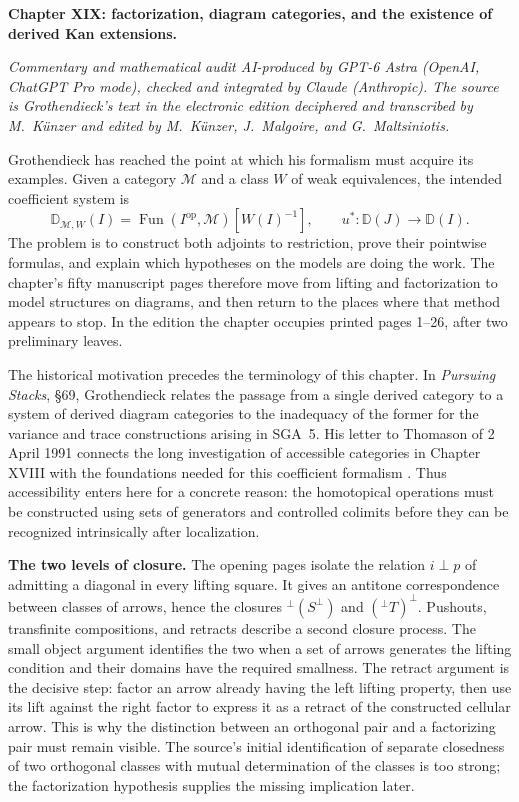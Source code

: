 \begingroup
{}
\noindent\textbf{Chapter XIX: factorization, diagram categories, and the existence of derived Kan extensions.}

\smallskip
\noindent\emph{Commentary and mathematical audit AI-produced by GPT-6 Astra
(OpenAI, ChatGPT Pro mode), checked and integrated by Claude (Anthropic). The
source is Grothendieck's text in the electronic edition deciphered and
transcribed by M.~K\"unzer and edited by M.~K\"unzer, J.~Malgoire, and
G.~Maltsiniotis.}

\medskip
Grothendieck has reached the point at which his formalism must acquire its
examples. Given a category $\mathcal M$ and a class $W$ of weak equivalences,
the intended coefficient system is
\[
 \mathbb D_{\mathcal M,W}(I)
   =\operatorname{Fun}(I^{\mathrm{op}},\mathcal M)[W(I)^{-1}],
 \qquad u^*:\mathbb D(J)\longrightarrow\mathbb D(I).
\]
The problem is to construct both adjoints to restriction, prove their pointwise
formulas, and explain which hypotheses on the models are doing the work. The
chapter's fifty manuscript pages therefore move from lifting and factorization
to model structures on diagrams, and then return to the places where that
method appears to stop. In the edition the chapter occupies printed pages 1--26,
after two preliminary leaves.

The historical motivation precedes the terminology of this chapter. In
\emph{Pursuing Stacks}, \S69, Grothendieck relates the passage from a single
derived category to a system of derived diagram categories to the inadequacy
of the former for the variance and trace constructions arising in SGA~5.
His letter to Thomason of 2 April 1991 connects the long investigation of
accessible categories in Chapter XVIII with the foundations needed for this
coefficient formalism \citep{Grothendieck1983,Grothendieck1991Letter}. Thus
accessibility enters here for a concrete reason: the homotopical operations
must be constructed using sets of generators and controlled colimits before
they can be recognized intrinsically after localization.

\noindent\textbf{The two levels of closure.}
The opening pages isolate the relation $i\mathbin{\perp}p$ of admitting a
diagonal in every lifting square. It gives an antitone correspondence between
classes of arrows, hence the closures
${}^{\perp}(S^{\perp})$ and $({}^{\perp}T)^{\perp}$. Pushouts, transfinite
compositions, and retracts describe a second closure process. The small
object argument identifies the two when a set of arrows generates the
lifting condition and their domains have the required smallness. The
retract argument is the decisive step: factor an arrow already having the
left lifting property, then use its lift against the right factor to express
it as a retract of the constructed cellular arrow. This is why the distinction
between an orthogonal pair and a factorizing pair must remain visible.
The source's initial identification of separate closedness of two orthogonal
classes with mutual determination of the classes is too strong; the
factorization hypothesis supplies the missing implication later.

